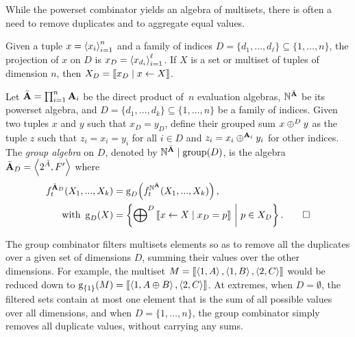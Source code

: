 While the powerset combinator yields an algebra of multisets, there is often a need to remove duplicates and to aggregate equal values.

\begin{definition}[Projection]
    Given a tuple \(x = \left\langle x_i\right\rangle_{i=1}^n\) and a family of indices \(D = \{d_1, \ldots, d_\ell\} \subseteq \{1, \ldots, n\}\), the projection of \(x\) on \(D\) is \(x_D = \left\langle x_{d_i}\right\rangle_{i=1}^\ell\).
    If \(X\) is a set or multiset of tuples of dimension \(n\), then \(X_D = \left[\mkern-2.5mu\left[x_D \mid x \gets X\right]\mkern-2.5mu\right]\).
\end{definition}


\begin{definition}\label{def:comb-group}
    Let \(\bar{\mathbf{A}} = \prod_{i=1}^n \mathbf{A}_i\) be the direct product of~\(n\) evaluation algebras,
    \(\mathbb{N}^{\bar{\mathbf{A}}}\) be its powerset algebra,
    and \(D = \{d_1, \ldots, d_k\} \subseteq \{1, \ldots, n\}\) be a family of indices.
    Given two tuples \(x\) and \(y\) such that \(x_D = y_D\), define their grouped sum \(x \mathbin{\oplus}^D y\) as the tuple \(z\) such that \(z_i = x_i = y_i\) for all \(i \in D\) and \(z_i = x_i \mathbin{\oplus}^{\mathbf{A}_i} y_i\) for other indices.
    The \emph{group algebra} on \(D\),
    denoted by \( \mathbb{N}^{\bar{\mathbf{A}}} \mid \mathrm{group}(D)\),
    is the algebra \(\bar{\mathbf{A}}_D = \left\langle2^{\bar A}, F'\right\rangle\)
    where
    \begin{align*}
        f^{\bar{\mathbf{A}}_D}_t(X_1, ..., X_k)
        &= \operatorname{g}_D\!\left(f^{\mathbb{N}^{\bar{\mathbf{A}}}}_t(X_1, ..., X_k)\right), \\
        \text{with }
        \operatorname{g}_D(X) &= \left\{{\bigoplus}^D\left[\mkern-2.5mu\left[x \gets X \mid x_D = p\right]\mkern-2.5mu\right] \ \middle|\ p \in X_D\right\}. \qedhere
    \end{align*}
\end{definition}

The group combinator filters multisets elements so as to remove all the duplicates over a given set of dimensions \(D\), summing their values over the other dimensions.
For example, the multiset \(M = \left[\mkern-2.5mu\left[\left\langle1, A\right\rangle, \left\langle1, B\right\rangle, \left\langle2, C\right\rangle\right]\mkern-2.5mu\right]\) would be reduced down to \(\operatorname{g}_{\{1\}}(M) = \left[\mkern-2.5mu\left[\left\langle1, A \mathbin{\oplus} B\right\rangle, \left\langle2, C\right\rangle\right]\mkern-2.5mu\right]\).
At extremes, when \(D = \emptyset\), the filtered sets contain at most one element that is the sum of all possible values over all dimensions, and when \(D = \{1, \ldots, n\}\), the group combinator simply removes all duplicate values, without carrying any sums.

